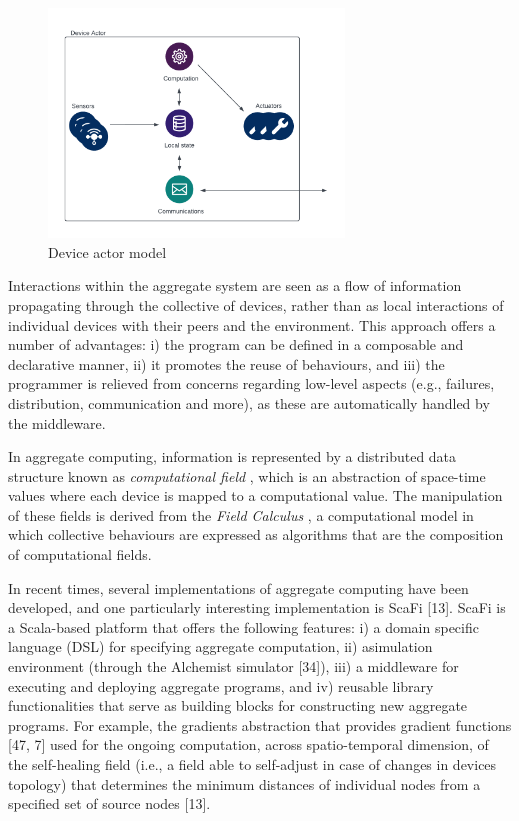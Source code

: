 \documentclass[12pt,a4paper,openright,twoside]{book}
\begin{document}
\begin{figure}[t]
    \centering
    \includegraphics[width=0.7\textwidth]{figures/deviceactor.pdf}
    \caption{Device actor model}
    \label{fig:device-actor}
\end{figure}

Interactions within the aggregate system are seen as a flow of information propagating through the 
    collective of devices, rather than as local interactions of individual devices with their
    peers and the environment. This approach offers a number of advantages:
    i) the program can be defined in a composable and declarative manner, 
    ii) it promotes the reuse of behaviours, and 
    iii) the programmer is relieved from concerns regarding low-level aspects (e.g., failures, distribution, communication and more), 
    as these are automatically handled by the middleware.

In aggregate computing, information is represented by a distributed data structure known as 
    \emph{computational field} \cite{VIROLI2019100486, 1316820},
    which is an abstraction of space-time values where each device is mapped to a computational value.
    The manipulation of these fields is derived from the \emph{Field Calculus} \cite{viroli2016higher}, a computational model in which collective 
    behaviours are expressed as algorithms that are the composition of computational fields.

In recent times, several implementations of aggregate computing have been developed, and one particularly interesting 
    implementation is ScaFi [13]. ScaFi is a Scala-based platform that offers the following features: 
    i) a domain specific language (DSL) for specifying aggregate computation, 
    ii) asimulation environment (through the Alchemist simulator [34]), 
    iii) a middleware for executing and deploying aggregate programs, and 
    iv) reusable library functionalities that serve as building blocks for constructing new aggregate programs. 
    For example, the gradients abstraction that provides gradient functions [47, 7] used for the ongoing computation, 
    across spatio-temporal dimension, of the self-healing field (i.e., a field able to self-adjust in case of changes 
    in devices topology) that determines the minimum distances of individual nodes from a specified set of source 
    nodes [13].
\end{document}
